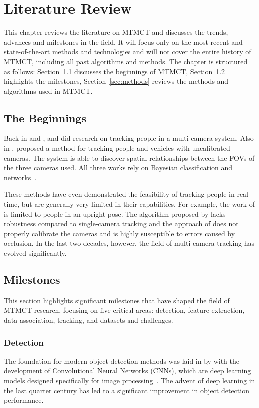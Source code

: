 \chapter{Literature Review}\label{chap:literature_review}
This chapter reviews the literature on MTMCT and discusses the trends, advances and milestones in the field. It will focus only on the most recent and state-of-the-art methods and technologies and will not cover the entire history of MTMCT, including all past algorithms and methods. The chapter is structured as follows: Section~\ref{sec:the_beginnings} discusses the beginnings of MTMCT, Section~\ref{sec:milestones} highlights the milestones, Section~\ref{sec:methods} reviews the methods and algorithms used in MTMCT.

\section{The Beginnings}\label{sec:the_beginnings}
Back in \citeyear{Cai99} and \citeyear{Chang01}, \textcite{Cai99} and \textcite{Chang01} did research on tracking people in a multi-camera system. Also in \citeyear{Khan01}, \textcite{Khan01} proposed a method for tracking people and vehicles with uncalibrated cameras. The system is able to discover spatial relationships between the FOVs of the three cameras used. All three works rely on Bayesian classification and networks~\cite{Pearl88}.

These methods have even demonstrated the feasibility of tracking people in real-time, but are generally very limited in their capabilities. For example, the work of \citeauthor{Chang01} is limited to people in an upright pose. The algorithm proposed by \citeauthor{Cai99} lacks robustness compared to single-camera tracking and the approach of \citeauthor{Khan01} does not properly calibrate the cameras and is highly susceptible to errors caused by occlusion. In the last two decades, however, the field of multi-camera tracking has evolved significantly.

\section{Milestones}\label{sec:milestones}
This section highlights significant milestones that have shaped the field of MTMCT research, focusing on five critical areas: detection, feature extraction, data association, tracking, and datasets and challenges.

\subsection{Detection}\label{subsec:milestone_detection}
The foundation for modern object detection methods was laid in \citeyear{Lecun98} by \citeauthor{Lecun98} with the development of Convolutional Neural Networks (CNNs), which are deep learning models designed specifically for image processing~\cite{Lecun98}. The advent of deep learning in the last quarter century has led to a significant improvement in object detection performance.

